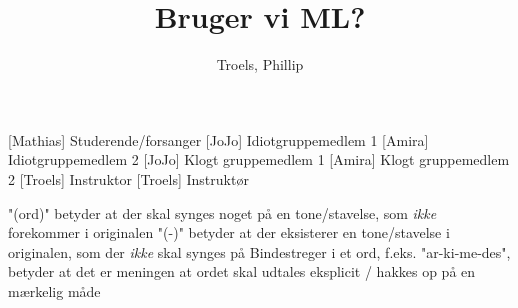 \documentclass[a4paper,11pt]{article}
\title{Bruger vi ML?}
\author{Troels, Phillip}
\begin{document}
\maketitle

\begin{roles}
  [Mathias] Studerende/forsanger
  [JoJo] Idiotgruppemedlem 1
  [Amira] Idiotgruppemedlem 2
  [JoJo] Klogt gruppemedlem 1
  [Amira] Klogt gruppemedlem 2
  [Troels] Instruktor
  [Troels] Instruktør
\end{roles}

\begin{props}
\end{props}

"(ord)" betyder at der skal synges noget på en tone/stavelse, som
\textit{ikke} forekommer i originalen "(-)" betyder at der
eksisterer en tone/stavelse i originalen, som der \textit{ikke} skal
synges på Bindestreger i et ord, f.eks. "ar-ki-me-des", betyder at
det er meningen at ordet skal udtales eksplicit / hakkes op på en
mærkelig måde
\end{document}
